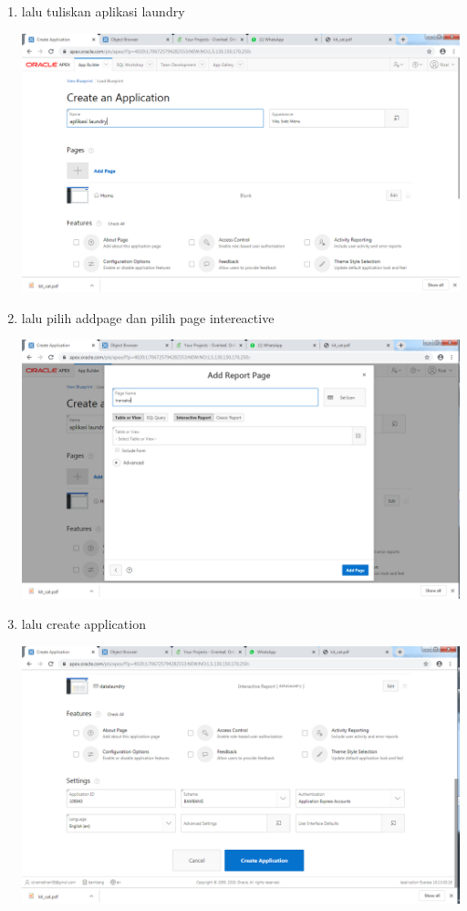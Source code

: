 \documentclass{article}
\begin{document}
\begin{enumerate}
\item lalu tuliskan aplikasi laundry
    \begin{center}
         \centering
            \includegraphics[scale=0.27]{gambar/Capture12.PNG}
        \caption{}
        \label{excel}
    \end{center}   

\item lalu pilih addpage dan pilih page intereactive 
    \begin{center}
         \centering
            \includegraphics[scale=0.27]{gambar/Capture13.PNG}
        \caption{}
        \label{excel}
    \end{center}  

\item lalu create application
    \begin{center}
         \centering
            \includegraphics[scale=0.27]{gambar/Capture14.PNG}
        \caption{}
        \label{excel}
    \end{center} 
    

\end{enumerate}
\end{document}
